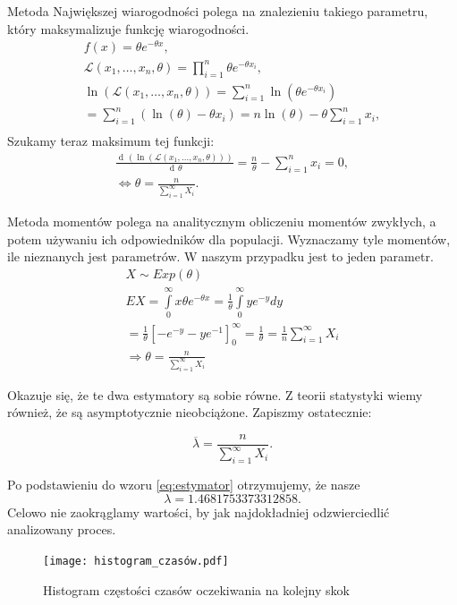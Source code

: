 \documentclass{article}
\theoremstyle{break}
\DeclareMathOperator{\diff}{d\!}
\numberwithin{equation}{subsection}
\numberwithin{figure}{section}
\begin{document}
Metoda Największej wiarogodności polega na znalezieniu takiego parametru, który maksymalizuje funkcję wiarogodności.
\begin{gather}
	f(x)=\theta e^{-\theta x},\\
	\mathcal{L}(x_1,\dots,x_n,\theta)= \prod\limits_{ i =1}^{n }\theta e^{-\theta x_i},\\
	\ln(\mathcal{L}(x_1,\dots,x_n,\theta))= \sum\limits_{ i =1}^{n}\ln(\theta e^{-\theta x_i})\\
	=\sum\limits_{ i =1}^{n}(\ln(\theta)-\theta x_i) = n\ln(\theta)-\theta\sum\limits_{ i =1}^{n}x_i,\\
\end{gather}
Szukamy teraz maksimum tej funkcji:
\begin{gather}
	\frac{\diff{(\ln(\mathcal{L}(x_1,\dots,x_n,\theta)))}}{\diff\theta} = \frac{n}{\theta}-\sum\limits_{ i =1}^{n}x_i=0,\\
	\Leftrightarrow \theta=\frac{n}{\sum\limits_{i=1}^{\infty}X_i}.
\end{gather}

Metoda momentów polega na analitycznym obliczeniu momentów zwykłych, a potem używaniu ich odpowiedników dla populacji. Wyznaczamy tyle momentów, ile nieznanych jest parametrów. W naszym przypadku jest to jeden parametr.
\begin{gather}
	X\sim Exp(\theta)\\
	EX=\int\limits_{0}^{\infty}x\theta e^{-\theta x}= \frac{1}{\theta}\int\limits_{0}^{\infty}ye^{-y}dy\\
	=\frac{1}{\theta}[-e^{-y}-ye^{-1}]_0^{\infty}=\frac{1}{\theta} =\frac{1}{n}\sum\limits_{i=1}^{\infty}X_i\\
	\Rightarrow \theta=\frac{n}{\sum\limits_{i=1}^{\infty}X_i}
\end{gather}

Okazuje się, że te dwa estymatory są sobie równe. Z teorii statystyki wiemy również, że są asymptotycznie nieobciążone. Zapiszmy ostatecznie:

\begin{equation}
\overline \lambda = \frac{n}{\sum\limits_{i=1}^{\infty}X_i} \label{eq:estymator}.
\end{equation}

 Po podstawieniu do wzoru \eqref{eq:estymator} otrzymujemy, że nasze $$\lambda = 1.4681753373312858.$$ Celowo nie zaokrąglamy wartości, by jak najdokładniej odzwierciedlić analizowany proces.

\begin{figure}[H]
	\center
	\texttt{[image: histogram\_czasów.pdf]}
	\caption{Histogram częstości czasów oczekiwania na kolejny skok}
	\label{fig: 4}
\end{figure}
\end{document}
